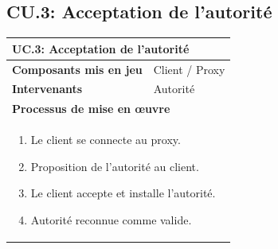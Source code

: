 \documentclass[a4paper,11pt,french]{article}
\begin{document}
\subsection{CU.3: Acceptation de l'autorité}
\begin{center}
        \vspace*{0.7cm}
        \begin{tabularx}{16cm}{|l|X|}
        \hline
        \multicolumn{2}{|l|}{\textbf{UC.3: Acceptation de l'autorité}}\\
        \hline
        \textbf{Composants mis en jeu} & Client / Proxy  \\
        \hline
        \textbf{Intervenants} &  Autorité \\
        \hline
        \multicolumn{2}{|l|}{\textbf{Processus de mise en \oe uvre} }\\
        \hline
        \multicolumn{2}{|p{15cm}|}{\begin{enumerate}\item Le client se connecte au proxy. \item Proposition de l'autorité au client.\item Le client accepte et installe l'autorité.\item Autorité reconnue comme valide.\end{enumerate}}\\ 
        \hline 
        \end{tabularx}
\end{center}

\vspace{2cm}
\end{document}
